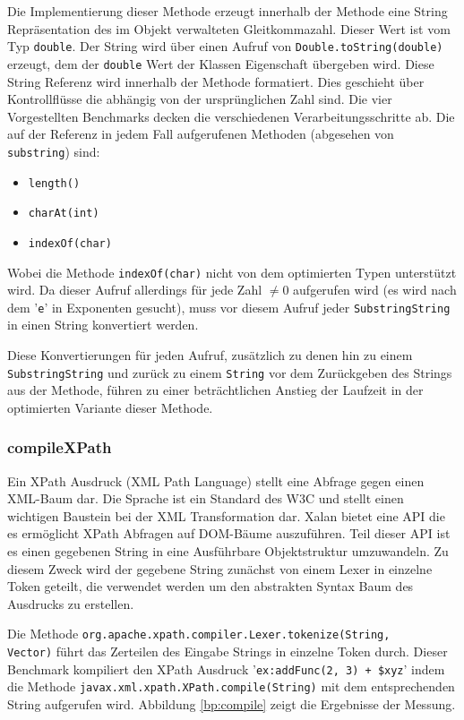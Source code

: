 Die Implementierung dieser Methode erzeugt innerhalb der Methode eine String Repräsentation des
im Objekt verwalteten Gleitkommazahl. Dieser Wert ist vom Typ \texttt{double}. Der 
String wird über einen Aufruf von \texttt{Double.toString(double)} erzeugt, dem der 
\texttt{double} Wert der Klassen Eigenschaft übergeben wird. Diese String Referenz wird innerhalb der 
Methode formatiert. Dies geschieht über Kontrollflüsse die abhängig von der ursprünglichen Zahl sind.
Die vier Vorgestellten Benchmarks decken die verschiedenen Verarbeitungsschritte ab. Die auf der
Referenz in jedem Fall aufgerufenen Methoden (abgesehen von \texttt{substring}) sind:

\begin{itemize}
	\item \texttt{length()}
	\item \texttt{charAt(int)}
	\item \texttt{indexOf(char)}
\end{itemize}

Wobei die Methode \texttt{indexOf(char)} nicht von dem optimierten Typen unterstützt wird.
Da dieser Aufruf allerdings für jede Zahl $\neq 0$ aufgerufen wird (es wird nach dem '\texttt{e}' in
Exponenten gesucht), muss vor diesem Aufruf jeder \texttt{SubstringString} in einen String
konvertiert werden. 

Diese Konvertierungen für jeden Aufruf, zusätzlich zu denen hin zu einem \texttt{SubstringString}
und zurück zu einem \texttt{String} vor dem Zurückgeben des Strings aus der Methode, führen zu 
einer beträchtlichen Anstieg der Laufzeit in der optimierten Variante dieser Methode.


\subsubsection{compileXPath}

Ein XPath Ausdruck (XML Path Language) stellt eine Abfrage gegen einen XML-Baum dar. Die Sprache
ist ein Standard des W3C und stellt einen wichtigen Baustein bei der XML Transformation dar.
Xalan bietet eine API die es ermöglicht XPath Abfragen auf DOM-Bäume auszuführen. Teil dieser
API ist es einen gegebenen String in eine Ausführbare Objektstruktur umzuwandeln. Zu diesem Zweck
wird der gegebene String zunächst von einem Lexer in einzelne Token geteilt, die verwendet werden
um den abstrakten Syntax Baum des Ausdrucks zu erstellen.

Die Methode \texttt{org.apache.xpath.compiler.Lexer.tokenize(String, \\Vector)} führt das Zerteilen 
des Eingabe Strings in einzelne Token durch. Dieser Benchmark kompiliert den XPath Ausdruck
'\texttt{ex:addFunc(2, 3) + \$xyz}' indem die Methode \texttt{javax.xml.xpath.XPath.compile(String)}
mit dem entsprechenden String aufgerufen wird. Abbildung \ref{bp:compile} zeigt die Ergebnisse 
der Messung.

